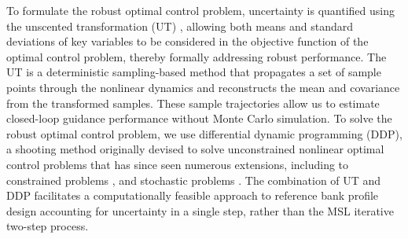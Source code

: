 \documentclass[journal ]{new-aiaa}
\begin{document}
To formulate the robust optimal control problem, uncertainty is quantified using the unscented transformation (UT) \cite{UT1997}, allowing both means and standard deviations of key variables to be considered in the objective function of the optimal control problem, thereby formally addressing robust performance. The UT is a deterministic sampling-based method that propagates a set of sample points through the nonlinear dynamics and reconstructs the mean and covariance from the transformed samples. These sample trajectories allow us to estimate closed-loop guidance performance without Monte Carlo simulation. To solve the robust optimal control problem, we use differential dynamic programming (DDP)\cite{DDP,DDP2}, a shooting method originally devised to solve unconstrained nonlinear optimal control problems that has since seen numerous extensions, including to constrained problems \cite{DDP_ControlLimited,HDDP1,HDDP2,DDP_NonlinearConstraints,DDP_InteriorPoint}, and stochastic problems \cite{iLQG, DDP_Stochastic, ozaki_UT,ozaki2020tube}. The combination of UT and DDP facilitates a computationally feasible approach to reference bank profile design accounting for uncertainty in a single step, rather than the MSL iterative two-step process.

\end{document}
